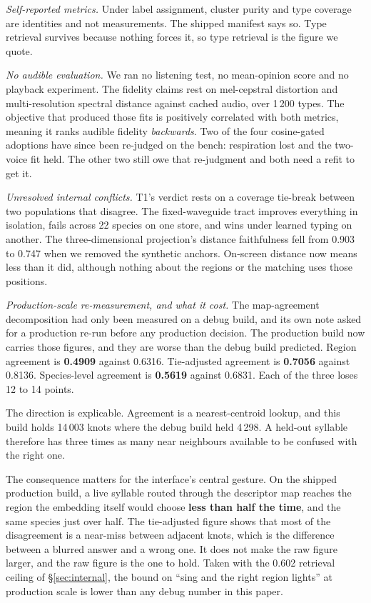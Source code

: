 \documentclass[10pt,twocolumn,a4paper]{article}
\begin{document}
\emph{Self-reported metrics.} Under label assignment, cluster purity and type coverage are
identities and not measurements. The shipped manifest says so. Type retrieval survives because
nothing forces it, so type retrieval is the figure we quote.

\emph{No audible evaluation.} We ran no listening test, no mean-opinion score and no playback
experiment. The fidelity claims rest on mel-cepstral distortion and multi-resolution spectral
distance against cached audio, over 1\,200 types. The objective that produced those fits is
positively correlated with both metrics, meaning it ranks audible fidelity \emph{backwards}. Two
of the four cosine-gated adoptions have since been re-judged on the bench: respiration lost and
the two-voice fit held. The other two still owe that re-judgment and both need a refit to get
it.

\emph{Unresolved internal conflicts.} T1's verdict rests on a coverage tie-break between two
populations that disagree. The fixed-waveguide tract improves everything in isolation, fails
across 22 species on one store, and wins under learned typing on another. The
three-dimensional projection's distance faithfulness fell from 0.903 to 0.747 when we removed
the synthetic anchors. On-screen distance now means less than it did, although nothing about
the regions or the matching uses those positions.

\emph{Production-scale re-measurement, and what it cost.} The map-agreement decomposition had
only been measured on a debug build, and its own note asked for a production re-run before any
production decision. The production build now carries those figures, and they are worse than
the debug build predicted. Region agreement is \textbf{0.4909} against 0.6316. Tie-adjusted
agreement is \textbf{0.7056} against 0.8136. Species-level agreement is \textbf{0.5619} against
0.6831. Each of the three loses 12 to 14 points.

The direction is explicable. Agreement is a nearest-centroid lookup, and this build holds
14\,003 knots where the debug build held 4\,298. A held-out syllable therefore has three times
as many near neighbours available to be confused with the right one.

The consequence matters for the interface's central gesture. On the shipped production build, a
live syllable routed through the descriptor map reaches the region the embedding itself would
choose \textbf{less than half the time}, and the same species just over half. The tie-adjusted
figure shows that most of the disagreement is a near-miss between adjacent knots, which is the
difference between a blurred answer and a wrong one. It does not make the raw figure larger,
and the raw figure is the one to hold. Taken with the 0.602 retrieval ceiling of
\S\ref{sec:internal}, the bound on ``sing and the right region lights'' at production scale is
lower than any debug number in this paper.
\end{document}
